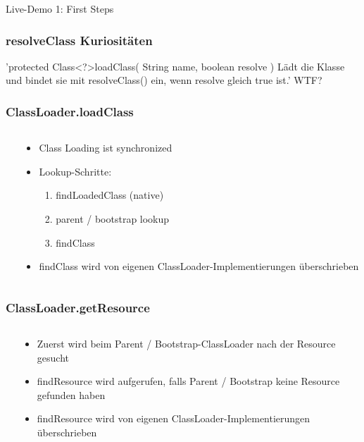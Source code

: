 \documentclass[aspectratio=169]{beamer}
\begin{document}
\begin{frame}
	Live-Demo 1: First Steps
\end{frame}

\begin{frame}
	\frametitle{resolveClass Kuriositäten}
	'protected Class\textless?\textgreater loadClass( String name, boolean resolve ) Lädt die Klasse und bindet sie mit resolveClass() ein, wenn resolve gleich true ist.'
	WTF?
	
\end{frame}

\begin{frame}
	\frametitle{ClassLoader.loadClass}
	\begin{columns}[T] 
		\begin{column}{.57\textwidth}
			
		\end{column}
		\hfill
		\begin{column}{.43\textwidth}
			\begin{itemize}
				\item{Class Loading ist synchronized}
				\item{Lookup-Schritte:}
				\begin{enumerate}
				\item{findLoadedClass (native)}
				\item{parent / bootstrap lookup}
				\item{findClass}
				\end{enumerate}
				\item{findClass wird von eigenen ClassLoader-Implementierungen überschrieben}
			\end{itemize}
		\end{column}
	\end{columns}
\end{frame}

\begin{frame}[fragile]
	\frametitle{ClassLoader.getResource}
	\begin{columns}[T] 
		\begin{column}{.50\textwidth}
			
	\end{column}
	\hfill
	\begin{column}{.50\textwidth}
			\begin{itemize}
				\item{Zuerst wird beim Parent / Bootstrap-ClassLoader nach der Resource gesucht}
				\item{findResource wird aufgerufen, falls Parent / Bootstrap keine Resource gefunden haben}
				\item{findResource wird von eigenen ClassLoader-Implementierungen überschrieben}
			\end{itemize}
		\end{column}
	\end{columns}
\end{frame}
\end{document}
